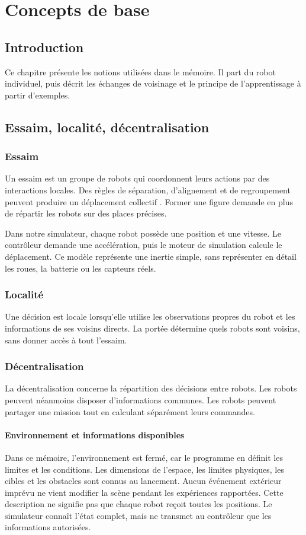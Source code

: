 \chapter{Concepts de base}
\label{chap:notions}

\section{Introduction}
Ce chapitre présente les notions utilisées dans le mémoire. Il part du robot individuel, puis décrit les échanges de voisinage et le principe de l’apprentissage à partir d’exemples.

\section{Essaim, localité, décentralisation}
\subsection{Essaim}
Un essaim est un groupe de robots qui coordonnent leurs actions par des interactions locales. Des règles de séparation, d’alignement et de regroupement peuvent produire un déplacement collectif \cite{reynolds1987}. Former une figure demande en plus de répartir les robots sur des places précises.

Dans notre simulateur, chaque robot possède une position et une vitesse. Le contrôleur demande une accélération, puis le moteur de simulation calcule le déplacement. Ce modèle représente une inertie simple, sans représenter en détail les roues, la batterie ou les capteurs réels.

\subsection{Localité}
Une décision est locale lorsqu'elle utilise les observations propres du robot et les informations de ses voisins directs. La portée détermine quels robots sont voisins, sans donner accès à tout l’essaim.

\subsection{Décentralisation}
La décentralisation concerne la répartition des décisions entre robots. Les robots peuvent néanmoins disposer d’informations communes. Les robots peuvent partager une mission tout en calculant séparément leurs commandes.

\subsubsection{Environnement et informations disponibles}
Dans ce mémoire, l'environnement est fermé, car le programme en définit les limites et les conditions. Les dimensions de l'espace, les limites physiques, les cibles et les obstacles sont connus au lancement. Aucun événement extérieur imprévu ne vient modifier la scène pendant les expériences rapportées. Cette description ne signifie pas que chaque robot reçoit toutes les positions. Le simulateur connaît l'état complet, mais ne transmet au contrôleur que les informations autorisées.

